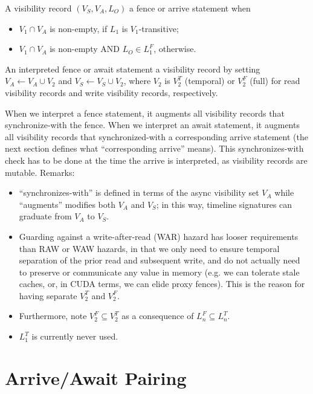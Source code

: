 \filbreak
A visibility record $(V_S, V_A, L_O)$  a fence or arrive statement when
\begin{itemize}
  \item $V_1 \cap V_A$ is non-empty, if $L_1$ is $V_1$-transitive;
  \filbreak
  \item $V_1 \cap V_A$ is non-empty AND $L_O \in L_1^F$, otherwise.
\end{itemize}
\filbreak

\filbreak
An interpreted fence or await statement  a visibility record by setting $V_A \leftarrow V_A \cup V_2$ and $V_S \leftarrow V_S \cup V_2$, where $V_2$ is $V_2^T$ (temporal) or $V_2^F$ (full) for read visibility records and write visibility records, respectively.

\filbreak
When we interpret a fence statement, it augments all visibility records that synchronize-with the fence.
When we interpret an await statement, it augments all visibility records that synchronized-with a corresponding arrive statement
(the next section defines what ``corresponding arrive'' means).
This synchronizes-with check has to be done at the time the arrive is interpreted, as visibility records are mutable.
Remarks:
\filbreak
\begin{itemize}
  \item ``synchronizes-with'' is defined in terms of the async visibility set $V_A$ while ``augments'' modifies both $V_A$ and $V_S$; in this way, timeline signatures can graduate from $V_A$ to $V_S$.
  \filbreak
  \item Guarding against a write-after-read (WAR) hazard has looser requirements than RAW or WAW hazards, in that we only need to ensure temporal separation of the prior read and subsequent write, and do not actually need to preserve or communicate any value in memory (e.g. we can tolerate stale caches, or, in CUDA terms, we can elide proxy fences).
  This is the reason for having separate $V_2^T$ and $V_2^F$.
  \filbreak
  \item Furthermore, note $V_2^F \subseteq V_2^T$ as a consequence of $L_n^F \subseteq L_n^T$.
  \filbreak
  \item $L_1^T$ is currently never used.
\end{itemize}

\newpage
\section{Arrive/Await Pairing}
\label{ch:ArriveAwaitPairing}

